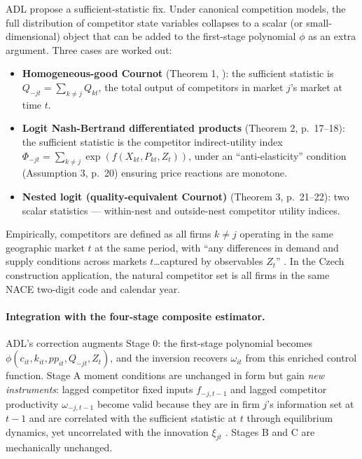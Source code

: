 \documentclass[11pt]{article}
\begin{document}
ADL propose a sufficient-statistic fix. Under canonical competition models, the full distribution of competitor state variables collapses to a scalar (or small-dimensional) object that can be added to the first-stage polynomial $\phi$ as an extra argument. Three cases are worked out:

\begin{itemize}
\item \textbf{Homogeneous-good Cournot} (Theorem 1, \citealt[p.~13--14]{ADL2024}): the sufficient statistic is $Q_{-jt} = \sum_{k\neq j} Q_{kt}$, the total output of competitors in market $j$'s market at time $t$.
\item \textbf{Logit Nash-Bertrand differentiated products} (Theorem 2, p.~17--18): the sufficient statistic is the competitor indirect-utility index $\Phi_{-jt} = \sum_{k\neq j} \exp(f(X_{kt},P_{kt},Z_t))$, under an ``anti-elasticity'' condition (Assumption 3, p.~20) ensuring price reactions are monotone.
\item \textbf{Nested logit (quality-equivalent Cournot)} (Theorem 3, p.~21--22): two scalar statistics --- within-nest and outside-nest competitor utility indices.
\end{itemize}

Empirically, competitors are defined as all firms $k \neq j$ operating in the same geographic market $t$ at the same period, with ``any differences in demand and supply conditions across markets $t$\ldots captured by observables $Z_t$'' \citep[p.~10, fn.~10]{ADL2024}. In the Czech construction application, the natural competitor set is all firms in the same NACE two-digit code and calendar year.

\paragraph{Integration with the four-stage composite estimator.} ADL's correction augments Stage 0: the first-stage polynomial becomes $\phi(c_{it}, k_{it}, pp_{it}, Q_{-jt}, Z_t)$, and the inversion recovers $\omega_{it}$ from this enriched control function. Stage A moment conditions are unchanged in form but gain \emph{new instruments}: lagged competitor fixed inputs $f_{-j,t-1}$ and lagged competitor productivity $\omega_{-j,t-1}$ become valid because they are in firm $j$'s information set at $t-1$ and are correlated with the sufficient statistic at $t$ through equilibrium dynamics, yet uncorrelated with the innovation $\xi_{jt}$ \citep[eq.~39, p.~29]{ADL2024}. Stages B and C are mechanically unchanged.
\end{document}
